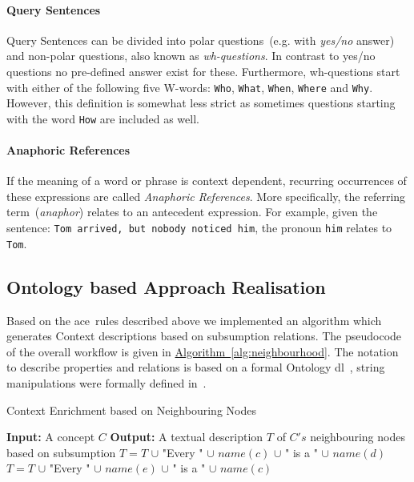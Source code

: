 \paragraph{Query Sentences} Query Sentences can be divided into polar questions~(e.g. with \textit{yes/no} answer) and non-polar questions, also known as \emph{wh-questions}. In contrast to yes/no questions no pre-defined answer exist for these. Furthermore, wh-questions start with either of the following five W-words: \texttt{Who}, \texttt{What}, \texttt{When}, \texttt{Where} and \texttt{Why}. However, this definition is somewhat less strict as sometimes questions starting with the word \texttt{How} are included as well.

\paragraph{Anaphoric References} If the meaning of a word or phrase is context dependent, recurring occurrences of these expressions are called \textit{Anaphoric References}. More specifically, the referring term~(\textit{anaphor}) relates to an antecedent expression. For example, given the sentence: \texttt{Tom arrived, but nobody noticed him}, the pronoun \texttt{him} relates to \texttt{Tom}. 

\subsection{Ontology based Approach Realisation}\label{sec:enrichment_ontology_approach}
Based on the \gls{ace}~rules described above we implemented an algorithm which generates Context descriptions based on subsumption relations. The pseudocode of the overall workflow is given in \hyperref[alg:neighbourhood]{Algorithm~\ref*{alg:neighbourhood}}. The notation to describe properties and relations is based on a formal Ontology \gls{dl}~\cite{baader2003}, string manipulations were formally defined in~\cite{hopcroft1969}.

\begin{algorithm}
	\caption{Context Enrichment based on Neighbouring Nodes}\label{alg:neighbourhood}
	\begin{algorithmic}[1]
		\newline
			\textbf{Input:} A concept $C$\newline
			\textbf{Output:} A textual description $T$ of $C's$ neighbouring nodes based on subsumption\newline
			 \label{alg:neighbourhood:text_initialisation}
				\State $T=T$ $\cup$ "Every " $\cup$ $name(c)$ $\cup$ " is a " $\cup$ $name(d)$
			\EndFor
				\State $T=T$ $\cup$ "Every " $\cup$ $name(e)$ $\cup$ " is a " $\cup$ $name(c)$
			\EndFor
		\EndProcedure
	\end{algorithmic}
\end{algorithm}

